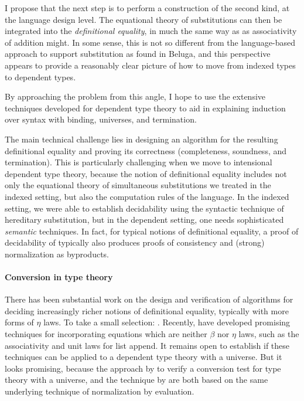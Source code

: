 \documentclass{article}
\begin{document}
I propose that the next step is to perform a construction of the
second kind, at the language design level. The equational theory of
substitutions can then be integrated into the \emph{definitional
 equality}, in much the same way as as associativity of addition
might. In some sense, this is not so
different from the language-based approach to support
substitution as found in Beluga, and this perspective appears to
provide a reasonably clear
picture of how to move from indexed types to dependent types.

By approaching the problem from this angle, I hope to use the
extensive techniques developed for dependent type theory to aid in
explaining induction over syntax with binding, universes, and
termination.

The main technical challenge lies in designing an algorithm for the
resulting definitional equality and proving its correctness
(completeness, soundness, and termination). This is particularly
challenging when we move to intensional dependent type theory, because
the notion of definitional equality includes not only the 
equational theory of simultaneous substitutions we treated in the
indexed setting, but also the computation rules of the language. In
the indexed setting, we were able to establish decidability using the
syntactic technique of hereditary substitution, but in the dependent
setting, one needs sophisticated \emph{semantic} techniques. In fact,
for typical notions of definitional equality, a proof of decidability
of typically also produces proofs of
consistency and (strong) normalization as byproducts.


\paragraph{Conversion in type theory} There has been substantial work on the design and verification
of algorithms for deciding increasingly richer notions of definitional
equality, typically with more forms of $\eta$ laws. To take a
small selection: \cite{Coquand91,Harper05,Abel11}. Recently,
\cite{Allais13} have developed promising techniques for incorporating equations
which are neither $\beta$ nor $\eta$ laws, such as the associativity
and unit laws for list append. It remains open to establish if 
these techniques can be applied to a dependent type theory with a
universe. But it looks promising, because the approach by
\cite{Abel07} to verify a conversion test for type theory with a
universe, and the technique by \cite{Allais13} are both based on the
same underlying technique of normalization by evaluation.
\end{document}
